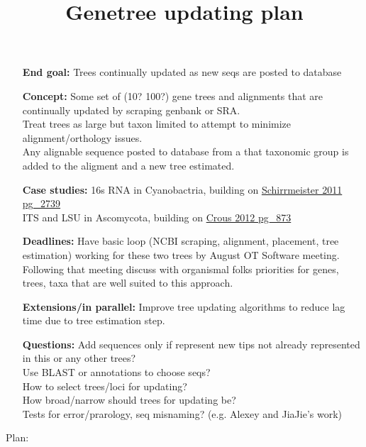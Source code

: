 \documentclass[a4paper,10pt]{article}
\title{Genetree updating plan}
\author{}
\begin{document}
\maketitle

\begin{itemize}
 \item [\textbf{End goal:}]
Trees continually updated as new seqs are posted to database
 \item[\textbf{Concept:}]
Some set of (10? 100?) gene trees and alignments that are continually updated by scraping genbank or SRA.\\
Treat trees as large but taxon limited to attempt to minimize alignment/orthology issues.\\
Any alignable sequence posted to database from a that taxonomic group is added to the aligment and a new tree estimated.
 \item[\textbf{Case studies:}]
16s RNA in Cyanobactria, building on \href{https://tree.opentreeoflife.org/curator/study/view/pg_2739}{Schirrmeister 2011 pg\_2739}\\
ITS and LSU in Ascomycota, building on \href{https://tree.opentreeoflife.org/curator/study/view/pg_873}{Crous 2012 pg\_873}\\
 \item[\textbf{Deadlines:}]
Have basic loop (NCBI scraping, alignment, placement, tree estimation) working for these two trees by August OT Software meeting.\\
Following that meeting discuss with organismal folks priorities for genes, trees, taxa that are well suited to this approach.\\
 \item[\textbf{Extensions/in parallel:}]
Improve tree updating algorithms to reduce lag time due to tree estimation step.\\
 \item[\textbf{Questions:}]
Add sequences only if represent new tips not already represented in this or any other trees?\\
Use BLAST or annotations to choose seqs?\\
How to select trees/loci for updating?\\
How broad/narrow should trees for updating be?\\
Tests for error/prarology, seq misnaming? (e.g. Alexey and JiaJie's work)\\
\end{itemize}


Plan:
\end{document}
